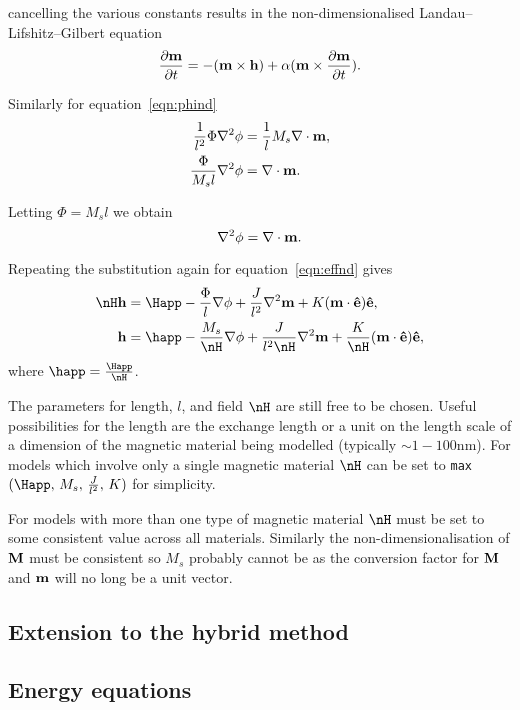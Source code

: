 cancelling the various constants results in the non-dimensionalised Landau--Lifshitz--Gilbert equation
\begin{equation}
  \label{eq:53}
  \frac{\partial \mathbf{m}}{\partial t} = - (\mathbf{m} \times \mathbf{h}) + \alpha (\mathbf{m} \times \frac{\partial \mathbf{m}}{\partial t}).
\end{equation}

Similarly for equation~\eqref{eqn:phind}
\begin{align}
  \frac{1}{l^2} \Phi \nabla^{2} \phi &= \frac{1}{l} M_s \nabla \cdot \mathbf{m}, \notag \\
  \frac{\Phi}{M_s l} \nabla^{2} \phi &= \nabla \cdot \mathbf{m}.
\end{align}

Letting $\Phi = M_s l$ we obtain
\begin{equation}
  \label{eq:57}
  \nabla^2 \phi = \nabla \cdot \mathbf{m}.
\end{equation}

Repeating the substitution again for equation~\eqref{eqn:effnd} gives
\begin{align}
  \nH \hv &= \Happ - \frac{\Phi}{l} \nabla \phi + \frac{J}{l^2} \nabla^2 \mv + K (\mv \cdot \ev) \ev, \notag \\
  \hv &= \happ - \frac{M_s}{\nH} \nabla \phi + \frac{J}{l^2 \nH} \nabla^2 \mv + \frac{K}{\nH} (\mv \cdot \ev) \ev,
\end{align}
where $\happ = \frac{\Happ}{\nH}$.

The parameters for length, $l$, and field $\nH$ are still free to be chosen. Useful possibilities for the length are the exchange length or a unit on the length scale of a dimension of the magnetic material being modelled (typically $\sim1-100$nm). For models which involve only a single magnetic material $\nH$ can be set to {\tt max}$(\Happ,\, M_s,\, \frac{J}{l^2}, \, K)$ for simplicity.

For models with more than one type of magnetic material $\nH$ must be set to some consistent value across all materials. Similarly the non-dimensionalisation of $\mathbf{M}$ must be consistent so $M_s$ probably cannot be as the conversion factor for $\mathbf{M}$ and $\mathbf{m}$ will no long be a unit vector.

\subsection{Extension to the hybrid method}
\label{sec:extens-hybr-met}

\subsection{Energy equations}

